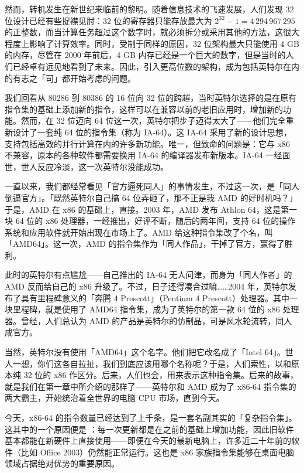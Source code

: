 然而，转机发生在新世纪来临前的黎明。随着信息技术的飞速发展，人们发现 32 位设计已经有些捉襟见肘：32 位的寄存器只能存放最大为 $2^{32}-1=4\,294\,967\,295$ 的正整数，而当计算任务超过这个数字时，就必须拆分或采用其他的方法，这很大程度上影响了计算效率。同时，受制于同样的原因，32 位架构最大只能使用 4 GB 的内存，尽管在 2000 年前后，4 GB 内存已经是一个巨大的数字，但是当时的人们已经卓有远见地看到了未来。因此，引入更高位数的架构，成为包括英特尔在内的有志之「司」都开始考虑的问题。

我们回看从 80286 到 80386 的 16 位向 32 位的跨越，当时英特尔选择的是在原有指令集的基础上添加新的指令，这样可以在兼容以前的老旧应用时，增加新的功能。然而，在 32 位迈向 64 位这一次，英特尔把步子迈得太大了——他们完全重新设计了一套纯 64 位的指令集（称为 IA-64）。这 IA-64 采用了新的设计思想，支持包括高效的并行计算在内的许多新功能。唯一，但致命的问题是：它与 x86 不兼容，原本的各种软件都需要换用 IA-64 的编译器发布新版本。IA-64 一经面世，世人反应冷淡，这一次英特尔没能成功。

一直以来，我们都经常看见「官方逼死同人」的事情发生，不过这一次，是「同人倒逼官方」。「既然英特尔自己搞 64 位弄砸了，那不正是我 AMD 的好时机吗？」于是，AMD 在 x86 的基础上，直接。2003 年，AMD 发布 Athlon 64，这是第一块 64 位的 x86 处理器，一经推出，好评不断，随后的两年间，支持 64 位的操作系统和应用软件就开始出现在市场上了。AMD 给这种指令集改了个名，叫「AMD64」。这一次，AMD 的指令集作为「同人作品」，干掉了官方，赢得了胜利。

此时的英特尔有点尴尬——自己推出的 IA-64 无人问津，而身为「同人作者」的 AMD 反而给自己的 x86 升级了。不过，日子还得凑合过嘛……2004 年，英特尔发布了具有里程碑意义的「奔腾 4 Prescott」（Pentium 4 Prescott）处理器。其中一块里程碑，就是使用了 AMD64 指令集，成为了英特尔的第一款 64 位的 x86 处理器。曾经，人们总认为 AMD 的产品是英特尔的仿制品，可是风水轮流转，同人成官方。

当然，英特尔没有使用「AMD64」这个名字。他们把它改名成了「Intel 64」。世人一想，你们这各自拉扯，我们到底应该用哪个名称呢？于是，人们索性，以和原本纯 32 位的 x86 作区分。后来，人们也会，用来表示这种指令集。后来的故事，就是我们在第一章中所介绍的那样了——英特尔和 AMD 成为了 x86-64 指令集的两大霸主，开始统治着全世界的电脑 CPU 市场，直到今天。

今天，x86-64 的指令数量已经达到了上千条，是一套名副其实的「复杂指令集」。这其中的一个原因便是 ：每一次更新都是在之前的基础上增加功能，因此旧软件基本都能在新硬件上直接使用——即便在今天的最新电脑上，许多近二十年前的软件（比如 Office 2003）仍然能正常运行。这也是 x86 家族指令集能够在桌面电脑领域占据绝对优势的重要原因。

